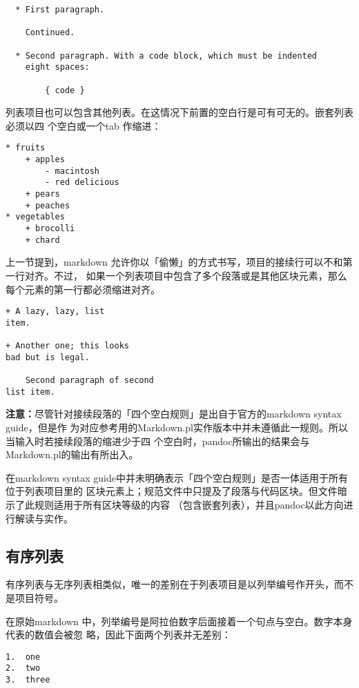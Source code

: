 \documentclass[fancyhdr,bookmark]{ctexbook}
\begin{document}
\begin{lstlisting}
  * First paragraph.

    Continued.

  * Second paragraph. With a code block, which must be indented
    eight spaces:

        { code }
\end{lstlisting}

列表项目也可以包含其他列表。在这情况下前置的空白行是可有可无的。嵌套列表必须以四
个空白或一个tab 作缩进：

\begin{lstlisting}
* fruits
    + apples
        - macintosh
        - red delicious
    + pears
    + peaches
* vegetables
    + brocolli
    + chard
\end{lstlisting}

上一节提到，markdown
允许你以「偷懒」的方式书写，项目的接续行可以不和第一行对齐。不过，
如果一个列表项目中包含了多个段落或是其他区块元素，那么每个元素的第一行都必须缩进对齐。

\begin{lstlisting}
+ A lazy, lazy, list
item.

+ Another one; this looks
bad but is legal.

    Second paragraph of second
list item.
\end{lstlisting}

\textbf{注意：}尽管针对接续段落的「四个空白规则」是出自于官方的markdown
syntax guide，但是作
为对应参考用的Markdown.pl实作版本中并未遵循此一规则。所以当输入时若接续段落的缩进少于四
个空白时，pandoc所输出的结果会与Markdown.pl的输出有所出入。

在markdown syntax
guide中并未明确表示「四个空白规则」是否一体适用于所有位于列表项目里的
区块元素上；规范文件中只提及了段落与代码区块。但文件暗示了此规则适用于所有区块等级的内容
（包含嵌套列表），并且pandoc以此方向进行解读与实作。

\subsection{有序列表}\label{ux6709ux5e8fux5217ux8868}

有序列表与无序列表相类似，唯一的差别在于列表项目是以列举编号作开头，而不是项目符号。

在原始markdown
中，列举编号是阿拉伯数字后面接着一个句点与空白。数字本身代表的数值会被忽
略，因此下面两个列表并无差别：

\begin{lstlisting}
1.  one
2.  two
3.  three
\end{lstlisting}
\end{document}
